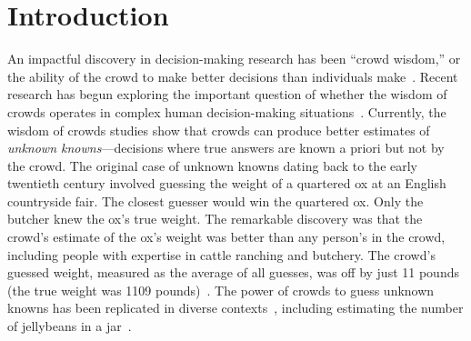 \documentclass[sigconf]{acmart}
\begin{document}


\maketitle

\section{Introduction}
An impactful discovery in decision-making research has been ``crowd wisdom,'' or the ability of the crowd to make better decisions than individuals make~\cite{arrow2008promise,hertwig2012tapping,malone2010collective, woolley2010,woolley2015,gloor2006swarm}. Recent research has begun exploring the important question of whether the wisdom of crowds operates in complex human decision-making situations~\cite{mann2017optimal,moore2017confidence,prelec2017solution,guilbeault2020networked,becker2019wisdom,qiu2019crowd,samiotis2022scriptoria,da2020harnessing}. Currently, the wisdom of crowds studies show that crowds can produce better estimates of \emph{unknown knowns}---decisions where true answers are known a priori but not by the crowd. The original case of unknown knowns dating back to the early twentieth century involved guessing the weight of a quartered ox at an English countryside fair. The closest guesser would win the quartered ox. Only the butcher knew the ox’s true weight. The remarkable discovery was that the crowd’s estimate of the ox’s weight was better than any person's in the crowd, including people with expertise in cattle ranching and butchery. The crowd’s guessed weight, measured as the average of all guesses, was off by just 11 pounds (the true weight was 1109 pounds)~\cite{galton1907vox}. The power of crowds to guess unknown knowns has been replicated in diverse contexts~\cite{surowiecki2005wisdom,simoiu2019studying}, including estimating the number of jellybeans in a jar~\cite{becker2017network}.
\end{document}
